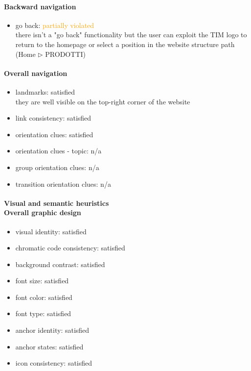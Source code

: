 \begin{enumerate}
	\paragraph*{Backward navigation}
	\begin{itemize}
		\item go back: \textcolor {orange}{partially violated}\\
		there isn't a "go back" functionality but the user can exploit the TIM logo to return to the homepage or select a position in the website structure path (Home $\triangleright$ PRODOTTI)
	\end{itemize}
	
	\paragraph*{Overall navigation}
	\begin{itemize}
		\item landmarks: satisfied\\
		they are well visible on the top-right corner of the website
		\item link consistency: satisfied
		\item orientation clues: satisfied
		\item orientation clues - topic: n/a
		\item group orientation clues: n/a
		\item transition orientation clues: n/a
	\end{itemize}	
	
	\paragraph*{Visual and semantic heuristics \\ Overall graphic design }
	\begin{itemize}
		\item visual identity: satisfied
		\item chromatic code consistency: satisfied
		\item background contrast: satisfied
		\item font size: satisfied
		\item font color: satisfied
		\item font type: satisfied
		\item anchor identity: satisfied
		\item anchor states: satisfied
		\item icon consistency: satisfied
	\end{itemize}
	

\end{enumerate}
